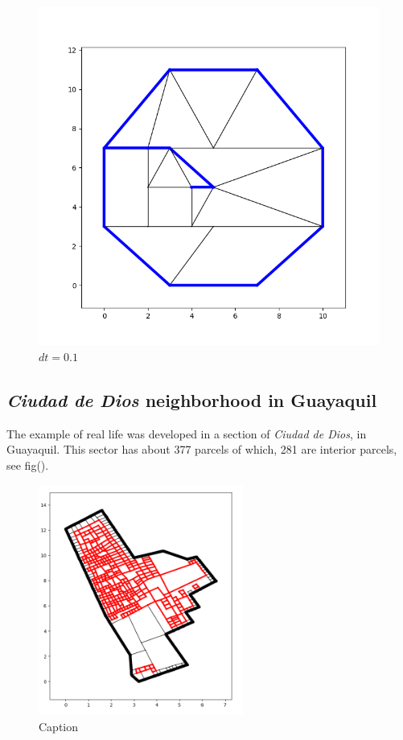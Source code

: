 \documentclass[10pt]{article}
\begin{document}
\begin{figure}[H]
\begin{minipage}{.45\linewidth}
        \includegraphics[width=1\textwidth]{images/Figure_13.png}
        \caption{$dt=0.1$}
        \label{fig:prob1_6_2}
    \end{minipage}
\end{figure}


\subsection{\emph{Ciudad de Dios} neighborhood in Guayaquil}

The example of real life was developed in a section of \emph{Ciudad de Dios}, in Guayaquil. This sector has about 377 parcels of which, 281 are interior parcels, see fig().

\begin{figure}[H]
    \centering
    \includegraphics[width=0.6\textwidth]{images/parcels}
    \caption{Caption}
    \label{fig:my_label}
\end{figure}
\end{document}
